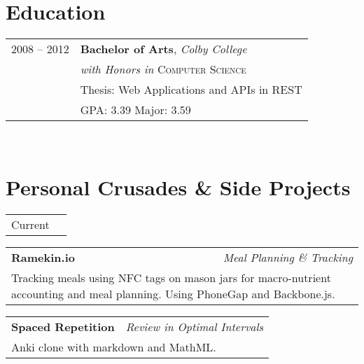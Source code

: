 \documentclass[10pt]{article} %
\begin{document}
{\begin{minipage}[t]{0.44\textwidth}

\section{Education}

\begin{tabular}{rl} %

2008 -- \textsc{2012} & \textbf{Bachelor of Arts}, \textit{Colby College}\\ 
											& \textit{with Honors in} \textsc{Computer Science} \\
											& \footnotesize Thesis: Web Applications and APIs in REST \\
											& \small{GPA: 3.39} \small{Major: 3.59} \\
\end{tabular}\\

\section{Personal Crusades \& Side Projects}

\vspace{5pt}

\begin{tabularx}{\linewidth}{ X r }
  {\large Current} \\
\end{tabularx}

\vspace{5pt}

\begin{tabularx}{\linewidth}{ X r }
  {\textbf{Ramekin.io}} & {\small\textit{Meal Planning \& Tracking}} \\
  \multicolumn{2}{p{\textwidth-2\fboxrule}}{ \small{ Tracking meals using NFC tags on mason jars for macro-nutrient accounting and meal planning. Using PhoneGap and Backbone.js. }}
\end{tabularx}

\vspace{5pt}

\begin{tabularx}{\linewidth}{ X r }
  {\textbf{Spaced Repetition}} & {\small\textit{Review in Optimal Intervals}} \\
  \multicolumn{2}{p{\textwidth-2\fboxrule}}{ \small{ Anki clone with markdown and MathML. }}
\end{tabularx}


\end{minipage}}
\end{document}
